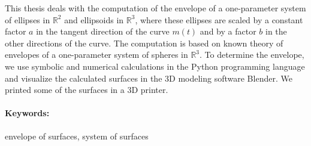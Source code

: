 \documentclass[12pt, twoside]{book}
\theoremstyle{definition}
\begin{document}
\noindent This thesis deals with the computation of the envelope of a one-parameter system of ellipses in $\mathbb{R}^2$ and ellipsoids in $\mathbb{R}^3$, where these ellipses are scaled by a constant factor $a$ in the tangent direction of the curve $m(t)$ and by a factor $b$ in the other directions of the curve. The computation is based on known  theory of envelopes of a one-parameter system of spheres in $\mathbb{R}^3$. To determine the envelope, we use symbolic and numerical calculations in the Python programming language and visualize the calculated surfaces in the 3D modeling software Blender. We printed some of the surfaces in a 3D printer.


\paragraph*{Keywords:} envelope of surfaces, system of surfaces


%
%



\newpage 

\tableofcontents



\newpage 

\listoffigures
\listoftables


\mainmatter


 








\end{document}
